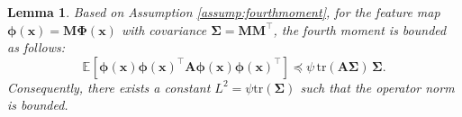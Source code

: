 \documentclass{article}
\theoremstyle{definition}
\theoremstyle{definition}
\theoremstyle{plain}
\theoremstyle{plain}
\theoremstyle{plain}
\newtheorem{lemma}{Lemma}
\theoremstyle{plain}
\theoremstyle{plain}
\newcommand{\bs}[1]{\boldsymbol{\mathbf{#1}}}
\newcommand{\tr}{\mathrm{tr}}
\newcommand{\vecx}{\mathbf{x}}
\newcommand{\M}{\mathbf{M}}
\newcommand{\ex}[2][]{\mathbb{E}_{#1}\left[ #2 \right]}
\begin{document}


    
\begin{lemma}\label{fourthmomrelax}
Based on Assumption \ref{assump:fourthmoment}, for the feature map $\bs\phi(\vecx) = \bs M \bs\Phi(\vecx)$ with covariance $\bs\Sigma = \bs M \bs M^\top$, the fourth moment is bounded as follows:
\begin{equation}
    \ex{\bs\phi(\vecx )\bs\phi(\vecx)^\top\bs A\bs\phi(\vecx)\bs\phi(\vecx)^\top} \preceq \psi\, \tr(\bs A\bs\Sigma)\, \bs\Sigma.
\end{equation}
Consequently, there exists a constant $L^2 = \psi \tr(\bs\Sigma)$ such that the operator norm is bounded.
\end{lemma}
\end{document}
